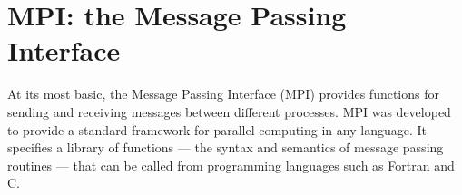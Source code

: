 
\begin{comment}
When a single processor takes too long to perform a computationally intensive task, there are two simple solutions.
The first is simply to build a faster processor.
Unfortunately, physics gets in the way.
In particular, the problem of heat dissipation has kept processor speeds from increasing as quickly in recent years as they did in the past.
The second solution is to have multiple processors work together on the same task.
This is the main idea behind parallel computing.

Today, high computing performance is achieved using many processors.
These processors communicate with each other and coordinate their tasks with a message passing system.
Essentially, a `supercomputer' is made up of many normal computers, each with its own memory.
These normal computers are all running the same program, but each takes a different execution path through the code as a result of the interactions that message passing makes possible.

Taking advantage of parallel processors is challenging; one cannot simply take a traditional program and expect it to run faster on a supercomputer because such programs consists of a single process --- a set of instructions to be executed sequentially.
A parallel program must be written which consists of many processes which can be executed simultaneously.
\end{comment}

\section*{MPI: the Message Passing Interface}

At its most basic, the Message Passing Interface (MPI) provides functions for sending and receiving messages between different processes.
MPI was developed to provide a standard framework for parallel computing in any language.
It specifies a library of functions --- the syntax and semantics of message passing routines --- that can be called from programming languages such as Fortran and C.

